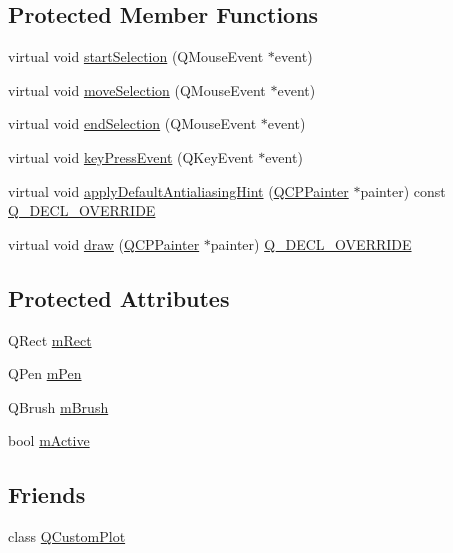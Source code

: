\subsection*{Protected Member Functions}
\begin{DoxyCompactItemize}
\item 
virtual void \hyperlink{class_q_c_p_selection_rect_a271f24cfca8bc50a0e2b4310ff90e227}{start\+Selection} (Q\+Mouse\+Event $\ast$event)
\item 
virtual void \hyperlink{class_q_c_p_selection_rect_a95c3f1700be2a6d7bba0fe56ece5fbb1}{move\+Selection} (Q\+Mouse\+Event $\ast$event)
\item 
virtual void \hyperlink{class_q_c_p_selection_rect_a625bcffd73987f6de6c6559aaf29ab9d}{end\+Selection} (Q\+Mouse\+Event $\ast$event)
\item 
virtual void \hyperlink{class_q_c_p_selection_rect_a1affe764316d6122a26fdb2e9583feb1}{key\+Press\+Event} (Q\+Key\+Event $\ast$event)
\item 
virtual void \hyperlink{class_q_c_p_selection_rect_aa854697618e16037ba9c73056abfb9bf}{apply\+Default\+Antialiasing\+Hint} (\hyperlink{class_q_c_p_painter}{Q\+C\+P\+Painter} $\ast$painter) const \hyperlink{qcustomplot_8h_a42cc5eaeb25b85f8b52d2a4b94c56f55}{Q\+\_\+\+D\+E\+C\+L\+\_\+\+O\+V\+E\+R\+R\+I\+DE}
\item 
virtual void \hyperlink{class_q_c_p_selection_rect_ab0e50ae796508bdcd97ab8c335c593bf}{draw} (\hyperlink{class_q_c_p_painter}{Q\+C\+P\+Painter} $\ast$painter) \hyperlink{qcustomplot_8h_a42cc5eaeb25b85f8b52d2a4b94c56f55}{Q\+\_\+\+D\+E\+C\+L\+\_\+\+O\+V\+E\+R\+R\+I\+DE}
\end{DoxyCompactItemize}
\subsection*{Protected Attributes}
\begin{DoxyCompactItemize}
\item 
Q\+Rect \hyperlink{class_q_c_p_selection_rect_a45a2600ef19c8f7b5ec6134beab036cf}{m\+Rect}
\item 
Q\+Pen \hyperlink{class_q_c_p_selection_rect_ae255dec12cd531071115bd667f0fd815}{m\+Pen}
\item 
Q\+Brush \hyperlink{class_q_c_p_selection_rect_a1bda3f02c2e4da58c856d19695028cbe}{m\+Brush}
\item 
bool \hyperlink{class_q_c_p_selection_rect_a1c167356b0bc59e62691bff8c90f5851}{m\+Active}
\end{DoxyCompactItemize}
\subsection*{Friends}
\begin{DoxyCompactItemize}
\item 
class \hyperlink{class_q_c_p_selection_rect_a1cdf9df76adcfae45261690aa0ca2198}{Q\+Custom\+Plot}
\end{DoxyCompactItemize}


